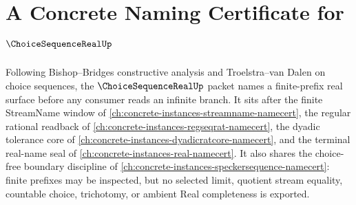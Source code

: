 \chapter{A Concrete Naming Certificate for $\ChoiceSequenceRealUp$}
\label{ch:concrete-instances-choice-sequence-real-namecert}

Following Bishop--Bridges constructive analysis and Troelstra--van Dalen on choice sequences, the $\ChoiceSequenceRealUp$ packet names a finite-prefix real surface before any consumer reads an infinite branch. It sits after the finite StreamName window of \autoref{ch:concrete-instances-streamname-namecert}, the regular rational readback of \autoref{ch:concrete-instances-regseqrat-namecert}, the dyadic tolerance core of \autoref{ch:concrete-instances-dyadicratcore-namecert}, and the terminal real-name seal of \autoref{ch:concrete-instances-real-namecert}. It also shares the choice-free boundary discipline of \autoref{ch:concrete-instances-speckersequence-namecert}: finite prefixes may be inspected, but no selected limit, quotient stream equality, countable choice, trichotomy, or ambient Real completeness is exported.

